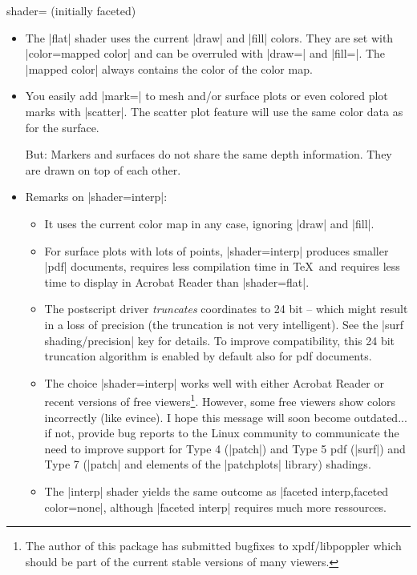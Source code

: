 {\begin{pgfplotskey}{shader= (initially faceted)}
\begin{itemize}
		|shader=flat,draw=|.

		\item The |flat| shader uses the current |draw| and |fill| colors. They are set with |color=mapped color| and can be overruled with |draw=| and |fill=|. The |mapped color| always contains the color of the color map. 

		\item You easily add |mark=| to mesh and/or surface plots or even colored plot marks with |scatter|. The scatter plot feature will use the same color data as for the surface.

		But: Markers and surfaces do not share the same depth information. They are drawn on top of each other.

		
		\item Remarks on |shader=interp|:
			\begin{itemize}
				\item It uses the current color map in any case, ignoring |draw| and |fill|.
				\item For surface plots with lots of points, |shader=interp| produces smaller |pdf| documents, requires less compilation time in \TeX\ and requires less time to display in Acrobat Reader than |shader=flat|.

				\item The postscript driver \emph{truncates} coordinates to 24 bit -- which might result in a loss of precision (the truncation is not very intelligent). See the |surf shading/precision| key for details. To improve compatibility, this 24 bit truncation algorithm is enabled by default also for pdf documents.
				\item The choice |shader=interp| works well with either Acrobat Reader or recent versions of free viewers\footnote{The author of this package has submitted bugfixes to xpdf/libpoppler which should be part of the current stable versions of many viewers.}. However, some free viewers show colors incorrectly (like evince).  I hope this message will soon become outdated... if not, provide bug reports to the Linux community to communicate the need to improve support for Type 4 (|patch|) and Type 5 pdf (|surf|) and Type 7 (|patch| and elements of the |patchplots| library) shadings.
				\item The |interp| shader yields the same outcome as |faceted interp,faceted color=none|, although |faceted interp| requires much more ressources.
			\end{itemize}
	\end{itemize}


\end{pgfplotskey}}
